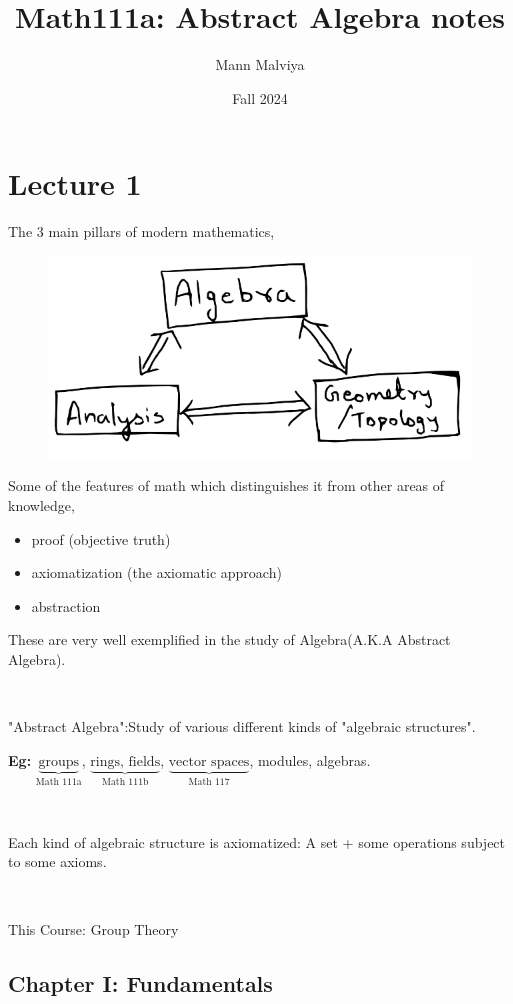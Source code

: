 \documentclass{article}
\title{Math111a: Abstract Algebra notes}
\author{Mann Malviya}
\date{Fall 2024}
\theoremstyle{definition}
\begin{document}
\maketitle

\section*{Lecture 1}
The 3 main pillars of modern mathematics,
\begin{figure}[H]
	\includegraphics[scale=2]{3main_pillars.png}
\end{figure}

Some of the features of math which distinguishes it from other areas of knowledge,
\begin{itemize}
    \item proof (objective truth)
    \item axiomatization (the axiomatic approach)
    \item abstraction
\end{itemize}

\noindent These are very well exemplified in the study of Algebra(A.K.A Abstract Algebra).

\

\noindent"Abstract Algebra":Study of various different  kinds of "algebraic structures".

\noindent\textbf{Eg:} $\underbrace{\text{groups}}_{\text{Math 111a}}$, 
$\underbrace{\text{rings, fields}}_{\text{Math 111b}}$, $\underbrace{\text{vector spaces}}_{\text{Math 117}}$, modules, algebras.

\

Each kind of algebraic structure is axiomatized: A set + some operations subject to some axioms.

\

\noindent This Course: Group Theory

\subsection*{Chapter I: Fundamentals}
\end{document}
